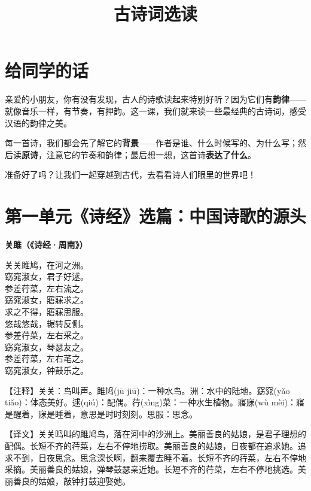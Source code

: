 \documentclass[a4paper,12pt]{ctexart}
\title{\textcolor{blue!70!black}{\Huge\textbf{古诗词选读}}}
\author{}
\date{}
\newcommand{\poemtitle}[1]{{\vspace{0.3cm}\noindent\textcolor{orange!80!black}{\large\bfseries #1}\par\vspace{0.1cm}}}
\newcommand{\annot}[1]{{\small\textcolor{blue!60!black}{#1}}}
\begin{document}
\maketitle
\thispagestyle{empty}

\section*{\textcolor{blue!70!black}{给同学的话}}

亲爱的小朋友，你有没有发现，古人的诗歌读起来特别好听？因为它们有\textbf{韵律}——就像音乐一样，有节奏，有押韵。这一课，我们就来读一些最经典的古诗词，感受汉语的韵律之美。

每一首诗，我们都会先了解它的\textbf{背景}——作者是谁、什么时候写的、为什么写；然后读\textbf{原诗}，注意它的节奏和韵律；最后想一想，这首诗\textbf{表达了什么}。

准备好了吗？让我们一起穿越到古代，去看看诗人们眼里的世界吧！

\newpage

\section*{\textcolor{orange!80!black}{第一单元\quad 《诗经》选篇：中国诗歌的源头}}

\poemtitle{关雎（《诗经·周南》）}

关关雎鸠，在河之洲。\\
窈窕淑女，君子好逑。\\
参差荇菜，左右流之。\\
窈窕淑女，寤寐求之。\\
求之不得，寤寐思服。\\
悠哉悠哉，辗转反侧。\\
参差荇菜，左右采之。\\
窈窕淑女，琴瑟友之。\\
参差荇菜，左右芼之。\\
窈窕淑女，钟鼓乐之。

\annot{【注释】关关：鸟叫声。雎鸠(jū jiū)：一种水鸟。洲：水中的陆地。窈窕(yǎo tiǎo)：体态美好。逑(qiú)：配偶。荇(xìng)菜：一种水生植物。寤寐(wù mèi)：寤是醒着，寐是睡着，意思是时时刻刻。思服：思念。}

\annot{【译文】关关鸣叫的雎鸠鸟，落在河中的沙洲上。美丽善良的姑娘，是君子理想的配偶。长短不齐的荇菜，左右不停地捞取。美丽善良的姑娘，日夜都在追求她。追求不到，日夜思念。思念深长啊，翻来覆去睡不着。长短不齐的荇菜，左右不停地采摘。美丽善良的姑娘，弹琴鼓瑟亲近她。长短不齐的荇菜，左右不停地挑选。美丽善良的姑娘，敲钟打鼓迎娶她。}
\end{document}
